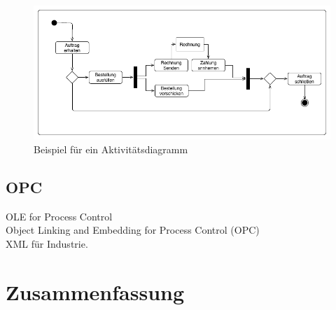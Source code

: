 \begin{figure}[hbt!]
 \centering
  \includegraphics[width=1\textwidth]{graphics/stateoftheart/Activity_bsp}
  \caption{Beispiel für ein Aktivitätsdiagramm}
\end{figure}
%
\subsection{OPC}
OLE for Process Control\\
Object Linking and Embedding for Process Control (OPC)\\
XML für Industrie. 
\newpage
\section{Zusammenfassung}

